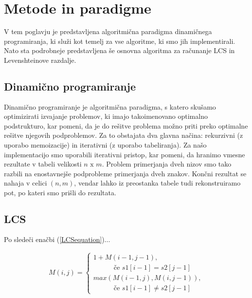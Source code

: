 \documentclass[a4paper,12pt,openright]{book}
\begin{document}
\chapter{Metode in paradigme}

V tem poglavju je predstavljena algoritmična paradigma dinamičnega programiranja, ki služi kot temelj za vse algoritme, ki smo jih implementirali. Nato sta podrobneje predstavljena še osnovna algoritma za računanje LCS in Levenshteinove razdalje. 

\section{Dinamično programiranje}

Dinamično programiranje je algoritmična paradigma, s katero skušamo optimizirati izvajanje problemov, ki imajo takoimenovano optimalno podstrukturo, kar pomeni, da je do rešitve problema možno priti preko optimalne rešitve njegovih podproblemov. Za to obstajata dva glavna načina: rekurzivni (z uporabo memoizacije) in iterativni (z uporabo tabeliranja). Za našo implementacijo smo uporabili iterativni pristop, kar pomeni, da hranimo vmesne rezultate v tabeli velikosti \begin{math}n \text{ x } m\end{math}. Problem primerjanja dveh nizov smo tako razbili na enostavnejše podprobleme primerjanja dveh znakov. Končni rezultat se nahaja v celici \begin{math}(n,m)\end{math}, vendar lahko iz preostanka tabele tudi rekonstruiramo pot, po kateri smo prišli do rezultata. 



\section{LCS}



Po sledeči enačbi (\ref{LCSequation})...

\begin{equation}
\label{LCSequation}
\begin{aligned}
M(i, j) = 
\begin{cases}
     1 + M(i-1, j-1) ,      \\ \quad \quad \quad\text{če } s1[i-1]=s2[j-1]\\
     max(M(i-1, j), M(i, j-1)) , \\ \quad \quad \quad \text{če } s1[i-1] \neq s2[j-1]
  \end{cases}
\end{aligned}
\end{equation}
\end{document}
